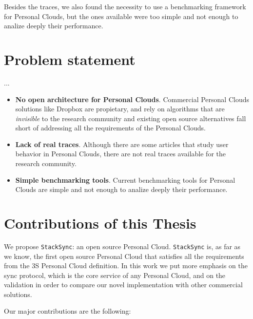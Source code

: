 Besides the traces, we also found the necessity to use a benchmarking framework for Personal Clouds, but the
ones available were too simple and not enough to analize deeply their performance.

\section{Problem statement}
...
\begin{itemize}
	\item \textbf{No open architecture for Personal Clouds}. Commercial Personal Clouds solutions like Dropbox
	are propietary, and rely on algorithms that are \textit{invisible} to the research community and existing open source alternatives fall short of addressing all the requirements of the Personal Clouds.
	\item \textbf{Lack of real traces}. Although there are some articles that study user behavior in Personal Clouds,
	there are not real traces available for the research community.
	\item \textbf{Simple benchmarking tools}. Current benchmarking tools for Personal Clouds are simple and not enough to
	analize deeply their performance.
\end{itemize}

\section{Contributions of this Thesis}
We propose \texttt{StackSync}: an open source Personal Cloud. \texttt{StackSync} is, as far as we know, the first
open source Personal Cloud that satisfies all the requirements from the 3S Personal Cloud definition. In this work we put more emphasis on the sync protocol, which is the core service of any Personal Cloud, and on the validation in order to compare our novel implementation with other commercial solutions.

Our major contributions are the following:


